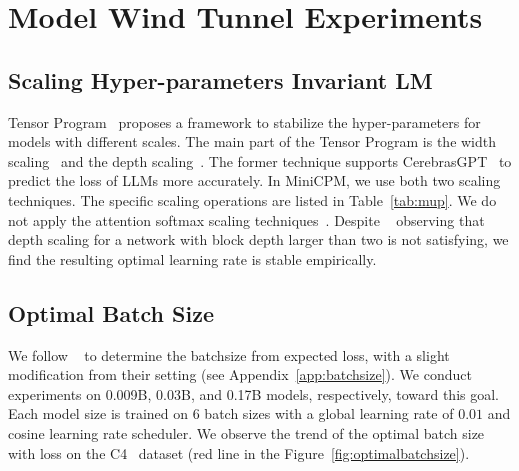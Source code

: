 \section{Model Wind Tunnel Experiments}
\label{MWTE}

\subsection{Scaling Hyper-parameters Invariant LM}
Tensor Program~\citep{yang2022tensor, yang2023tensor} proposes a framework to stabilize the hyper-parameters for models with different scales. The main part of the Tensor Program is the width scaling~\citep{yang2022tensor} and the depth scaling~\citep{yang2023tensor}. The former technique supports CerebrasGPT~\citep{dey2023cerebras} to predict the loss of LLMs more accurately. In MiniCPM, we use both two scaling techniques. The specific scaling operations are listed in Table~\ref{tab:mup}. We do not apply the attention softmax scaling techniques~\citep{yang2022tensor}. Despite ~\cite{yang2023tensor} observing that depth scaling for a network with block depth larger than two is not satisfying, we find the resulting optimal learning rate is stable empirically.

\subsection{Optimal Batch Size}
We follow ~\cite{kaplan2020scaling} to determine the batchsize from expected loss, with a slight modification from their setting (see Appendix~\ref{app:batchsize}). We conduct experiments on 0.009B, 0.03B, and 0.17B models, respectively, toward this goal. Each model size is trained on 6 batch sizes with a global learning rate of $0.01$ and cosine learning rate scheduler. We observe the trend of the optimal batch size with loss on the C4~\citep{2019t5} dataset (red line in the Figure~\ref{fig:optimalbatchsize}).

